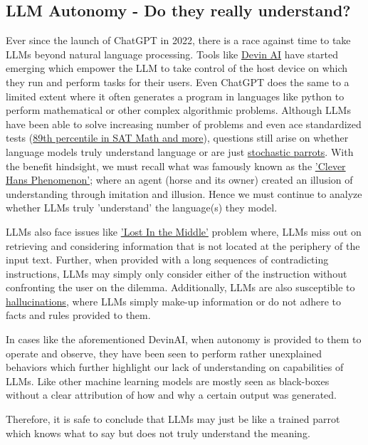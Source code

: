 \documentclass[12pt]{article}
\newcommand{\tab}{\hspace*{2em}} %
\begin{document}
    \subsection{LLM Autonomy - Do they really understand?}
    \tab Ever since the launch of ChatGPT in 2022, there is a race against time to take LLMs beyond natural language processing. Tools like \href{https://www.cognition.ai/blog/introducing-devin}{Devin AI} have started emerging which empower the LLM to take control of the host device on which they run and perform tasks for their users. Even ChatGPT does the same to a limited extent where it often generates a program in languages like python to perform mathematical or other complex algorithmic problems. Although LLMs have been able to solve increasing number of problems and even ace standardized tests (\href{https://openai.com/index/gpt-4-research/}{89th percentile in SAT Math and more}), questions still arise on whether language models truly understand language or are just \href{https://dl.acm.org/doi/10.1145/3442188.3445922}{stochastic parrots}. With the benefit hindsight, we must recall what was famously known as the \href{https://pmc.ncbi.nlm.nih.gov/articles/PMC3921203/}{'Clever Hans Phenomenon'}; where an agent (horse and its owner) created an illusion of understanding through imitation and illusion. Hence we must continue to analyze whether LLMs truly 'understand' the language(s) they model.

    LLMs also face issues like \href{https://arxiv.org/pdf/2307.03172}{'Lost In the Middle'} problem where, LLMs miss out on retrieving and considering information that is not located at the periphery of the input text. Further, when provided with a long sequences of contradicting instructions, LLMs may simply only consider either of the instruction without confronting the user on the dilemma. Additionally, LLMs are also susceptible to \href{https://arxiv.org/pdf/2401.11817}{hallucinations}, where LLMs simply make-up information or do not adhere to facts and rules provided to them.

    In cases like the aforementioned DevinAI, when autonomy is provided to them to operate and observe, they have been seen to perform rather unexplained behaviors which further highlight our lack of understanding on capabilities of LLMs. Like other machine learning models are mostly seen as black-boxes without a clear attribution of how and why a certain output was generated.

    Therefore, it is safe to conclude that LLMs may just be like a trained parrot which knows what to say but does not truly understand the meaning.
\end{document}
